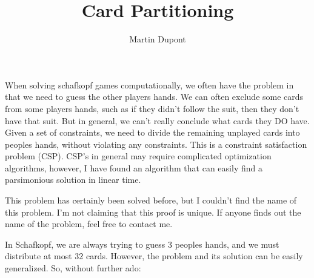 \documentclass[]{article}
\title{Card Partitioning}
\author{Martin Dupont}
\begin{document}
\maketitle

When solving schafkopf games computationally, we often have the problem in that we need to guess the other players hands. We can often exclude some cards from some players hands, such as if they didn't follow the suit, then they don't have that suit. But in general, we can't really conclude what cards they DO have. Given a set of constraints, we need to divide the remaining unplayed cards into peoples hands, without violating any constraints. This is a constraint satisfaction problem (CSP). CSP's in general may require complicated optimization algorithms, however, I have found an algorithm that can easily find a parsimonious solution in linear time. \newline

This problem has certainly been solved before, but I couldn't find the name of this problem. I'm not claiming that this proof is unique. If anyone finds out the name of the problem, feel free to contact me.\newline

In Schafkopf, we are always trying to guess 3 peoples hands, and we must distribute at most 32 cards. However, the problem and its solution can be easily generalized. So, without further ado: \newline
\end{document}
